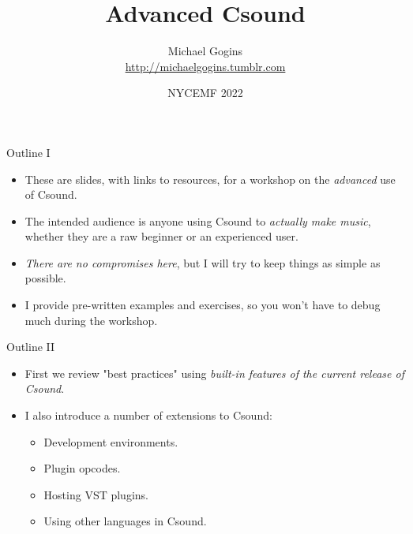 \documentclass{beamer}
\title{Advanced Csound}
\author[Gogins] %
{Michael Gogins \\ \url{http://michaelgogins.tumblr.com} }
\institute[Irreducible Productions] %
{
    Irreducible Productions\\
    New York
}
\date[NYCEMF 2022] %
{NYCEMF 2022}
\begin{document}
    
    \begin{frame}
        \titlepage
    \end{frame}
    
    \begin{frame}{Outline I}
        \begin{itemize}
            \item These are slides, with links to resources, for a workshop on the
            \textit{advanced} use of Csound.
            \item The intended audience is anyone using Csound to \textit{actually make
                music}, whether they are a raw beginner or an experienced user.           
             \item \textit{There are no compromises here}, but I will try to keep things
            as simple as possible.
            
            \item I provide pre-written examples and exercises, so you won't have to debug much 
            during the workshop.
        \end{itemize}
    \end{frame}
    
    \begin{frame}{Outline II}
        \begin{itemize}
           \item First we review "best practices" using \textit{built-in features of
            the current release of Csound}.
            \item I also introduce a number of extensions to Csound: 
                \begin{itemize}
                    \item Development environments.
                    \item Plugin opcodes.
                    \item Hosting VST plugins.
                    \item Using other languages in Csound.
                \end{itemize}
        \end{itemize}
    \end{frame}
    
\end{document}
